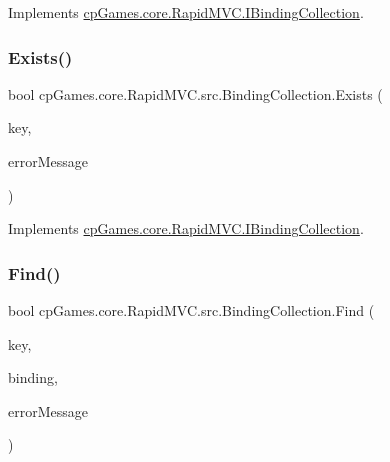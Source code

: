 Implements \mbox{\hyperlink{interfacecp_games_1_1core_1_1_rapid_m_v_c_1_1_i_binding_collection_ac77dd990cf638c604bb90646e2fed55d}{cp\+Games.\+core.\+Rapid\+M\+V\+C.\+I\+Binding\+Collection}}.

\mbox{\label{classcp_games_1_1core_1_1_rapid_m_v_c_1_1src_1_1_binding_collection_ac8b4fb2a303f8c8755d36bf90d989453}} 
\subsubsection{\texorpdfstring{Exists()}{Exists()}}
{\footnotesize\ttfamily bool cp\+Games.\+core.\+Rapid\+M\+V\+C.\+src.\+Binding\+Collection.\+Exists (\begin{DoxyParamCaption}\item[{\mbox{\hyperlink{interfacecp_games_1_1core_1_1_rapid_m_v_c_1_1_i_binding_key}{I\+Binding\+Key}}}]{key,  }\item[{out string}]{error\+Message }\end{DoxyParamCaption})}



Implements \mbox{\hyperlink{interfacecp_games_1_1core_1_1_rapid_m_v_c_1_1_i_binding_collection_affd71123e4a9ce2af8013c57b216332c}{cp\+Games.\+core.\+Rapid\+M\+V\+C.\+I\+Binding\+Collection}}.

\mbox{\label{classcp_games_1_1core_1_1_rapid_m_v_c_1_1src_1_1_binding_collection_a7d08f6f549f95ec651486e5295f985c8}} 
\subsubsection{\texorpdfstring{Find()}{Find()}}
{\footnotesize\ttfamily bool cp\+Games.\+core.\+Rapid\+M\+V\+C.\+src.\+Binding\+Collection.\+Find (\begin{DoxyParamCaption}\item[{\mbox{\hyperlink{interfacecp_games_1_1core_1_1_rapid_m_v_c_1_1_i_binding_key}{I\+Binding\+Key}}}]{key,  }\item[{out \mbox{\hyperlink{interfacecp_games_1_1core_1_1_rapid_m_v_c_1_1_i_binding}{I\+Binding}}}]{binding,  }\item[{out string}]{error\+Message }\end{DoxyParamCaption})}



